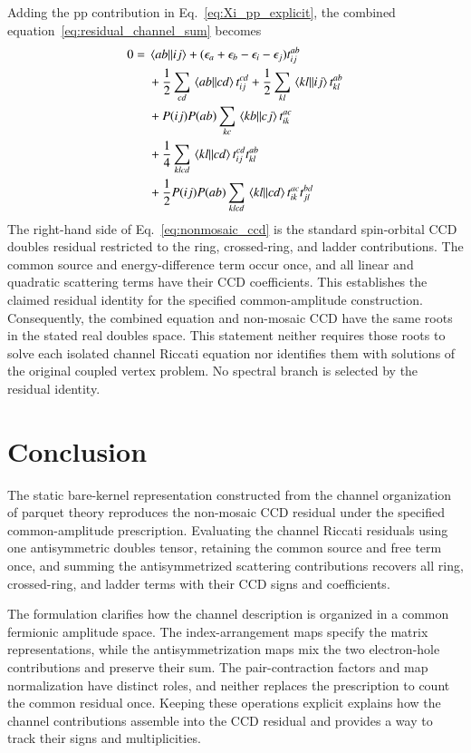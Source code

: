 \documentclass[aip,jcp,reprint,noshowkeys,superscriptaddress]{revtex4-1}
\newcommand{\pp}{\text{pp}}
\begin{document}
Adding the $\pp$ contribution in Eq.~\eqref{eq:Xi_pp_explicit}, the combined
equation~\eqref{eq:residual_channel_sum} becomes
\begin{align}
    0={}&
    \mel{ab}{}{ij}
    +
    (\epsilon_a+\epsilon_b-\epsilon_i-\epsilon_j)t_{ij}^{ab}
    \nonumber\\
    &+
    \frac12\sum_{cd}\mel{ab}{}{cd}t_{ij}^{cd}
    +
    \frac12\sum_{kl}\mel{kl}{}{ij}t_{kl}^{ab}
    \nonumber\\
    &+
    P(ij)P(ab)\sum_{kc}\mel{kb}{}{cj}t_{ik}^{ac}
    \nonumber\\
    &+
    \frac14\sum_{klcd}
    \mel{kl}{}{cd}t_{ij}^{cd}t_{kl}^{ab}
    \nonumber\\
    &+
    \frac12P(ij)P(ab)
    \sum_{klcd}
    \mel{kl}{}{cd}t_{ik}^{ac}t_{jl}^{bd}
    \label{eq:nonmosaic_ccd}
\end{align}
The right-hand side of Eq.~\eqref{eq:nonmosaic_ccd} is the standard
spin-orbital CCD doubles residual restricted to the ring, crossed-ring,
and ladder contributions.\cite{Scuseria2013} The common source and
energy-difference term occur once, and all linear and quadratic scattering
terms have their CCD coefficients. This establishes the claimed residual
identity for the specified common-amplitude construction. Consequently,
the combined equation and non-mosaic CCD have the same roots in the stated
real doubles space. This statement neither requires those roots to solve
each isolated channel Riccati equation nor identifies them with solutions
of the original coupled vertex problem. No spectral branch is selected by
the residual identity.

\section{Conclusion}
\label{sec:scope}

The static bare-kernel representation constructed from the channel
organization of parquet theory reproduces the non-mosaic CCD residual
under the specified common-amplitude prescription. Evaluating the channel Riccati residuals using one antisymmetric
doubles tensor, retaining the common source and free term once, and summing
the antisymmetrized scattering contributions recovers all ring,
crossed-ring, and ladder terms with their CCD signs and coefficients.

The formulation clarifies how the channel description is organized in a
common fermionic amplitude space. The index-arrangement maps specify the
matrix representations, while the antisymmetrization maps mix the two
electron-hole contributions and preserve their sum. The pair-contraction
factors and map normalization have distinct roles, and neither replaces
the prescription to count the common residual once. Keeping these
operations explicit explains how the channel contributions assemble into
the CCD residual and provides a way to track their signs and multiplicities.
\end{document}
